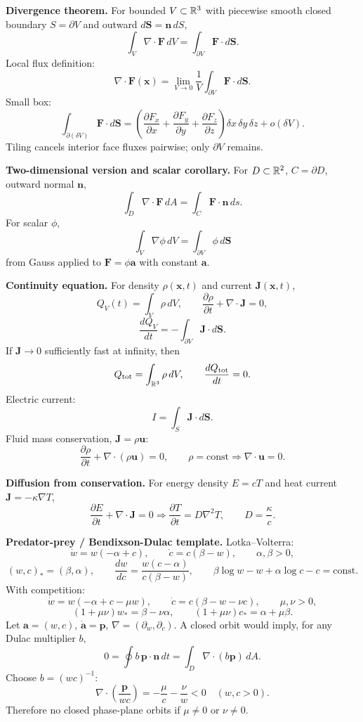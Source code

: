 \noindent\textbf{Divergence theorem.}\quad
For bounded $V\subset\mathbb{R}^3$ with piecewise smooth closed boundary
$S=\partial V$ and outward $d\mathbf{S}=\mathbf{n}\,dS$,
\[
\boxed{\int_V\nabla\cdot\mathbf{F}\,dV
=\int_{\partial V}\mathbf{F}\cdot d\mathbf{S}.}
\]
Local flux definition:
\[
\boxed{\nabla\cdot\mathbf{F}(\mathbf{x})
=\lim_{V\to0}\frac{1}{V}
\int_{\partial V}\mathbf{F}\cdot d\mathbf{S}.}
\]
Small box:
\[
\int_{\partial(\delta V)}\mathbf{F}\cdot d\mathbf{S}
=\left(\frac{\partial F_x}{\partial x}
+\frac{\partial F_y}{\partial y}
+\frac{\partial F_z}{\partial z}\right)\delta x\,\delta y\,\delta z+o(\delta V).
\]
Tiling cancels interior face fluxes pairwise; only $\partial V$ remains.

\noindent\textbf{Two-dimensional version and scalar corollary.}
For $D\subset\mathbb{R}^2$, $C=\partial D$, outward normal $\mathbf{n}$,
\[
\boxed{\int_D\nabla\cdot\mathbf{F}\,dA
=\int_C\mathbf{F}\cdot\mathbf{n}\,ds.}
\]
For scalar $\phi$,
\[
\boxed{\int_V\nabla\phi\,dV=\int_{\partial V}\phi\,d\mathbf{S}}
\]
from Gauss applied to $\mathbf{F}=\phi\mathbf{a}$ with constant $\mathbf{a}$.

\noindent\textbf{Continuity equation.}
For density $\rho(\mathbf{x},t)$ and current $\mathbf{J}(\mathbf{x},t)$,
\[
Q_V(t)=\int_V\rho\,dV,\qquad
\boxed{\frac{\partial\rho}{\partial t}+\nabla\cdot\mathbf{J}=0},
\]
\[
\boxed{\frac{dQ_V}{dt}
=-\int_{\partial V}\mathbf{J}\cdot d\mathbf{S}}.
\]
If $\mathbf{J}\to0$ sufficiently fast at infinity, then
\[
Q_{\rm tot}=\int_{\mathbb{R}^3}\rho\,dV,\qquad
\frac{dQ_{\rm tot}}{dt}=0.
\]
Electric current:
\[
I=\int_S\mathbf{J}\cdot d\mathbf{S}.
\]
Fluid mass conservation, $\mathbf{J}=\rho\mathbf{u}$:
\[
\frac{\partial\rho}{\partial t}+\nabla\cdot(\rho\mathbf{u})=0,
\qquad
\rho=\text{const}\Rightarrow \boxed{\nabla\cdot\mathbf{u}=0}.
\]

\noindent\textbf{Diffusion from conservation.}
For energy density $E=cT$ and heat current $\mathbf{J}=-\kappa\nabla T$,
\[
\frac{\partial E}{\partial t}+\nabla\cdot\mathbf{J}=0
\Rightarrow
\boxed{\frac{\partial T}{\partial t}=D\nabla^2T},
\qquad
D=\frac{\kappa}{c}.
\]

\noindent\textbf{Predator-prey / Bendixson-Dulac template.}
Lotka--Volterra:
\[
\dot w=w(-\alpha+c),\qquad
\dot c=c(\beta-w),\qquad \alpha,\beta>0,
\]
\[
(w,c)_*=(\beta,\alpha),\qquad
\frac{dw}{dc}=\frac{w(c-\alpha)}{c(\beta-w)},
\qquad
\boxed{\beta\log w-w+\alpha\log c-c=\text{const}.}
\]
With competition:
\[
\dot w=w(-\alpha+c-\mu w),\qquad
\dot c=c(\beta-w-\nu c),\qquad \mu,\nu>0,
\]
\[
(1+\mu\nu)w_*=\beta-\nu\alpha,\qquad
(1+\mu\nu)c_*=\alpha+\mu\beta.
\]
Let $\mathbf{a}=(w,c)$, $\dot{\mathbf{a}}=\mathbf{p}$, $\nabla=(\partial_w,\partial_c)$.
A closed orbit would imply, for any Dulac multiplier $b$,
\[
0=\oint b\,\mathbf{p}\cdot\mathbf{n}\,dt
=\int_D\nabla\cdot(b\mathbf{p})\,dA.
\]
Choose $b=(wc)^{-1}$:
\[
\boxed{\nabla\cdot\left(\frac{\mathbf{p}}{wc}\right)
=-\frac{\mu}{c}-\frac{\nu}{w}<0\quad(w,c>0).}
\]
Therefore no closed phase-plane orbits if $\mu\ne0$ or $\nu\ne0$.

